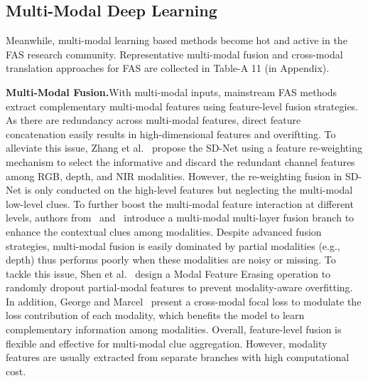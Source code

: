 \documentclass[10pt,journal,compsoc]{IEEEtran}
\begin{document}

\subsection{Multi-Modal Deep Learning}
Meanwhile, multi-modal learning based methods become hot and active in the FAS research community. Representative multi-modal fusion and cross-modal translation approaches for FAS are collected in Table-A 11 (in Appendix).


\vspace{0.4em}

\noindent\textbf{Multi-Modal Fusion.}\quad With multi-modal inputs, mainstream FAS methods extract complementary multi-modal features using feature-level fusion strategies. 
As there are redundancy across multi-modal features, direct feature concatenation easily results in high-dimensional features and overiftting. To alleviate this issue, Zhang et al.~\cite{zhang2020casia} propose the SD-Net using a feature re-weighting mechanism to select the informative and discard the redundant channel features among RGB, depth, and NIR modalities. However, the re-weighting fusion in SD-Net is only conducted on the high-level features but neglecting the multi-modal low-level clues. To further boost the multi-modal feature interaction at different levels, authors from~\cite{parkin2019recognizing} and~\cite{kuang2019multi} introduce a multi-modal multi-layer fusion branch to enhance the contextual clues among modalities. Despite advanced fusion strategies, multi-modal fusion is easily dominated by partial modalities (e.g., depth) thus performs poorly when these modalities are noisy or missing. To tackle this issue, Shen et al.~\cite{shen2019facebagnet} design a Modal Feature Erasing operation to randomly dropout partial-modal features to prevent modality-aware overfitting. In addition, George and Marcel~\cite{george2021cross} present a cross-modal focal loss to modulate the loss contribution of each modality, which benefits the model to learn complementary information among modalities. Overall, feature-level fusion is flexible and effective for multi-modal clue aggregation. However, modality features are usually extracted from separate branches with high computational cost. 

\end{document}
